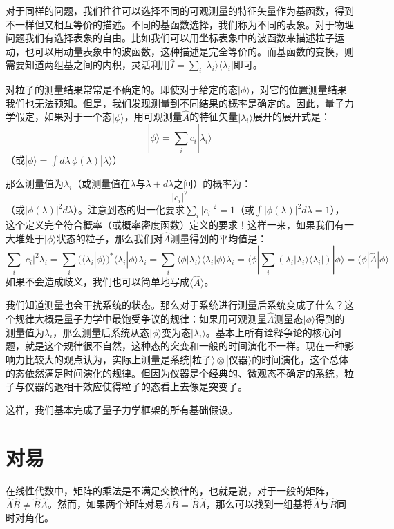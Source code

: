 \documentclass{ctexart}
\begin{document}
对于同样的问题，我们往往可以选择不同的可观测量的特征矢量作为基函数，得到不一样但又相互等价的描述。不同的基函数选择，我们称为不同的表象。对于物理问题我们有选择表象的自由。比如我们可以用坐标表象中的波函数来描述粒子运动，也可以用动量表象中的波函数，这种描述是完全等价的。而基函数的变换，则需要知道两组基之间的内积，灵活利用$\hat{I}=\sum_i|\lambda_i\rangle\langle\lambda_i|$即可。

对粒子的测量结果常常是不确定的。即使对于给定的态$|\phi\rangle$，对它的位置测量结果我们也无法预知。但是，我们发现测量到不同结果的概率是确定的。因此，量子力学假定，如果对于一个态$|\phi\rangle$，用可观测量$\hat{A}$的特征矢量$|\lambda_i\rangle$展开的展开式是：
\begin{equation}
|\phi\rangle=\sum_ic_i|\lambda_i\rangle
\end{equation}
（或$|\phi\rangle=\int d\lambda\, \phi(\lambda)|\lambda\rangle$）

那么测量值为$\lambda_i$（或测量值在$\lambda$与$\lambda+d\lambda$之间）的概率为：
\begin{equation}
|c_i|^2
\end{equation}
（或$|\phi(\lambda)|^2d\lambda$）。注意到态的归一化要求$\sum_i|c_i|^2=1$（或$\int|\phi(\lambda)|^2d\lambda=1$），这个定义完全符合概率（或概率密度函数）定义的要求！这样一来，如果我们有一大堆处于$|\phi\rangle$状态的粒子，那么我们对$\hat{A}$测量得到的平均值是：
\begin{equation}
\sum_i|c_i|^2\lambda_i=\sum_i(\langle\lambda_i|\phi\rangle)^*\langle\lambda_i|\phi\rangle\lambda_i=\sum_i\langle\phi|\lambda_i\rangle\langle\lambda_i|\phi\rangle\lambda_i=\langle\phi|\sum_i(\lambda_i|\lambda_i\rangle\langle\lambda_i|)|\phi\rangle=\langle\phi|\hat{A}|\phi\rangle
\end{equation}
如果不会造成歧义，我们也可以简单地写成$\langle\hat{A}\rangle$。

我们知道测量也会干扰系统的状态。那么对于系统进行测量后系统变成了什么？这个规律大概是量子力学中最饱受争议的规律：如果用可观测量$\hat{A}$测量态$|\phi\rangle$得到的测量值为$\lambda_i$，那么测量后系统从态$|\phi\rangle$变为态$|\lambda_i\rangle$。基本上所有诠释争论的核心问题，就是这个规律很不自然，这种态的突变和一般的时间演化不一样。现在一种影响力比较大的观点认为，实际上测量是系统$|\mbox{粒子}\rangle\otimes |\mbox{仪器}\rangle$的时间演化，这个总体的态依然满足时间演化的规律。但因为仪器是个经典的、微观态不确定的系统，粒子与仪器的退相干效应使得粒子的态看上去像是突变了。

这样，我们基本完成了量子力学框架的所有基础假设。

\section{对易}
在线性代数中，矩阵的乘法是不满足交换律的，也就是说，对于一般的矩阵，$\hat{A}\hat{B}\neq\hat{B}\hat{A}$。然而，如果两个矩阵对易$\hat{A}\hat{B}=\hat{B}\hat{A}$，那么可以找到一组基将$\hat{A}$与$\hat{B}$同时对角化。
\end{document}
